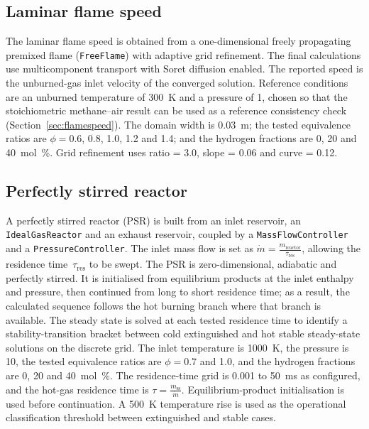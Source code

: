 \documentclass[11pt]{article}
\begin{document}
\subsection{Laminar flame speed}
The laminar flame speed is obtained from a one-dimensional freely propagating
premixed flame (\texttt{FreeFlame}) with adaptive grid refinement. The final
calculations use multicomponent transport with Soret diffusion enabled. The
reported speed is the unburned-gas inlet velocity of the converged solution.
Reference conditions are an unburned temperature of \SI{300}{\kelvin} and a
pressure of \SI{1}{\atmosphere}, chosen so that the stoichiometric methane--air
result can be used as a reference consistency check
(Section~\ref{sec:flamespeed}). The domain width is \SI{0.03}{\meter}; the
tested equivalence ratios are $\phi=0.6$, 0.8, 1.0, 1.2 and 1.4; and the
hydrogen fractions are 0, 20 and \SI{40}{\mole\percent}. Grid refinement uses
ratio = 3.0, slope = 0.06 and curve = 0.12.

\subsection{Perfectly stirred reactor}
A perfectly stirred reactor (PSR) is built from an inlet reservoir, an
\texttt{IdealGasReactor} and an exhaust reservoir, coupled by a
\texttt{MassFlowController} and a \texttt{PressureController}. The inlet mass
flow is set as $\dot{m} = \frac{m_\mathrm{reactor}}{\tau_\mathrm{res}}$, allowing the
residence time~$\tau_\mathrm{res}$ to be swept. The PSR is zero-dimensional,
adiabatic and perfectly stirred. It is initialised from equilibrium products at
the inlet enthalpy and pressure, then continued from long to short residence
time; as a result, the calculated sequence follows the hot burning branch
where that branch is available. The steady state is solved at each tested
residence time to identify a stability-transition bracket between cold
extinguished and hot stable steady-state solutions on the discrete grid. The
inlet temperature is \SI{1000}{\kelvin}, the pressure is
\SI{10}{\atmosphere}, the tested equivalence ratios are $\phi=0.7$ and 1.0,
and the hydrogen fractions are 0, 20 and \SI{40}{\mole\percent}. The
residence-time grid is 0.001 to \SI{50}{\milli\second} as configured, and the
hot-gas residence time is $\tau=\frac{m_\mathrm{ss}}{\dot{m}}$. Equilibrium-product
initialisation is used before continuation. A \SI{500}{\kelvin} temperature
rise is used as the operational classification threshold between extinguished
and stable cases.
\end{document}
